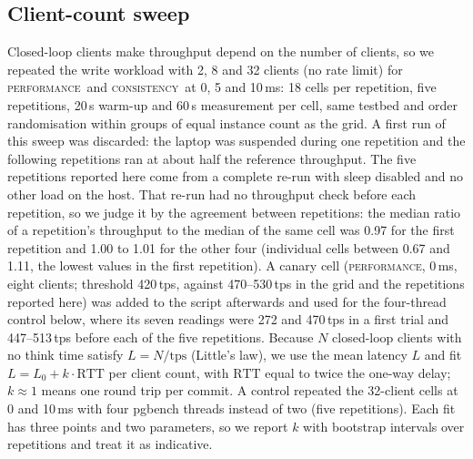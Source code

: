 \documentclass[smallextended]{svjour3}
\newcommand{\perf}{\textsc{performance}}
\newcommand{\cons}{\textsc{consistency}}
\begin{document}
\subsection{Client-count sweep}\label{sec:sweepmethod}
Closed-loop clients make throughput depend on the number of clients, so we repeated the write workload with 2, 8 and 32 clients (no rate limit) for \perf\ and \cons\ at 0, 5 and 10\,ms: 18 cells per repetition, five repetitions, 20\,s warm-up and 60\,s measurement per cell, same testbed and order randomisation within groups of equal instance count as the grid. A first run of this sweep was discarded: the laptop was suspended during one repetition and the following repetitions ran at about half the reference throughput. The five repetitions reported here come from a complete re-run with sleep disabled and no other load on the host. That re-run had no throughput check before each repetition, so we judge it by the agreement between repetitions: the median ratio of a repetition's throughput to the median of the same cell was 0.97 for the first repetition and 1.00 to 1.01 for the other four (individual cells between 0.67 and 1.11, the lowest values in the first repetition). A canary cell (\perf, 0\,ms, eight clients; threshold 420\,tps, against 470--530\,tps in the grid and the repetitions reported here) was added to the script afterwards and used for the four-thread control below, where its seven readings were 272 and 470\,tps in a first trial and 447--513\,tps before each of the five repetitions. Because $N$ closed-loop clients with no think time satisfy $L = N/\mathrm{tps}$ (Little's law), we use the mean latency $L$ and fit $L = L_0 + k\cdot\mathrm{RTT}$ per client count, with $\mathrm{RTT}$ equal to twice the one-way delay; $k\approx 1$ means one round trip per commit. A control repeated the 32-client cells at 0 and 10\,ms with four pgbench threads instead of two (five repetitions). Each fit has three points and two parameters, so we report $k$ with bootstrap intervals over repetitions and treat it as indicative.
\end{document}
